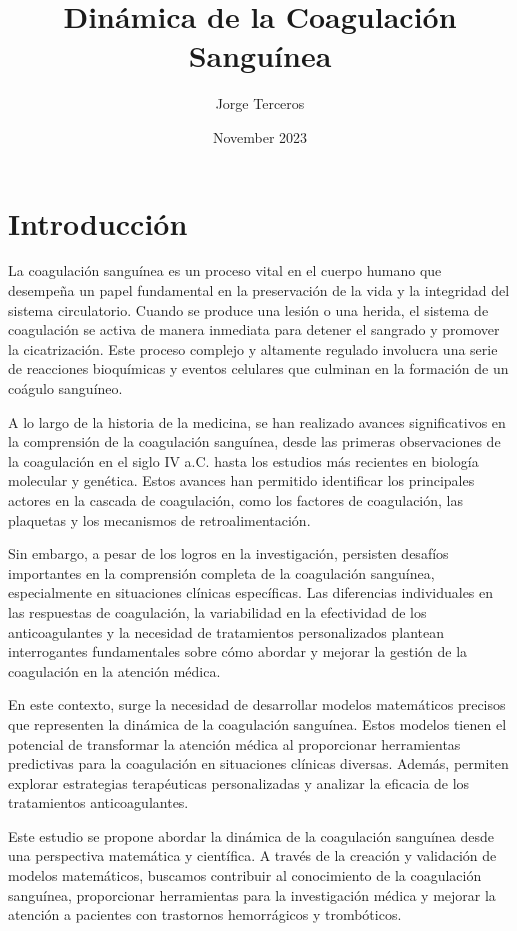 \documentclass{article}
\title{Dinámica de la Coagulación Sanguínea}
\author{Jorge Terceros}
\date{November 2023}
\begin{document}
\maketitle

\section{Introducción}

La coagulación sanguínea es un proceso vital en el cuerpo humano que desempeña un papel fundamental en la preservación de la vida y la integridad del sistema circulatorio. Cuando se produce una lesión o una herida, el sistema de coagulación se activa de manera inmediata para detener el sangrado y promover la cicatrización. Este proceso complejo y altamente regulado involucra una serie de reacciones bioquímicas y eventos celulares que culminan en la formación de un coágulo sanguíneo.

A lo largo de la historia de la medicina, se han realizado avances significativos en la comprensión de la coagulación sanguínea, desde las primeras observaciones de la coagulación en el siglo IV a.C. hasta los estudios más recientes en biología molecular y genética. Estos avances han permitido identificar los principales actores en la cascada de coagulación, como los factores de coagulación, las plaquetas y los mecanismos de retroalimentación.

Sin embargo, a pesar de los logros en la investigación, persisten desafíos importantes en la comprensión completa de la coagulación sanguínea, especialmente en situaciones clínicas específicas. Las diferencias individuales en las respuestas de coagulación, la variabilidad en la efectividad de los anticoagulantes y la necesidad de tratamientos personalizados plantean interrogantes fundamentales sobre cómo abordar y mejorar la gestión de la coagulación en la atención médica.

En este contexto, surge la necesidad de desarrollar modelos matemáticos precisos que representen la dinámica de la coagulación sanguínea. Estos modelos tienen el potencial de transformar la atención médica al proporcionar herramientas predictivas para la coagulación en situaciones clínicas diversas. Además, permiten explorar estrategias terapéuticas personalizadas y analizar la eficacia de los tratamientos anticoagulantes.

Este estudio se propone abordar la dinámica de la coagulación sanguínea desde una perspectiva matemática y científica. A través de la creación y validación de modelos matemáticos, buscamos contribuir al conocimiento de la coagulación sanguínea, proporcionar herramientas para la investigación médica y mejorar la atención a pacientes con trastornos hemorrágicos y trombóticos.
\end{document}
